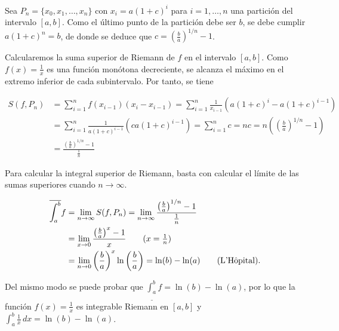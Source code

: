 \documentclass[
  spanish,
  a4paper,
]{scrreport}
\theoremstyle{definition}
\theoremstyle{remark}
\begin{document}
\begin{tcolorbox}[enhanced jigsaw, arc=.35mm, bottomrule=.15mm, bottomtitle=1mm, breakable, colback=white, colbacktitle=quarto-callout-tip-color!10!white, colframe=quarto-callout-tip-color-frame, coltitle=black, left=2mm, leftrule=.75mm, opacityback=0, opacitybacktitle=0.6, rightrule=.15mm, title=\textcolor{quarto-callout-tip-color}{\faLightbulb}\hspace{0.5em}{Solución}, titlerule=0mm, toprule=.15mm, toptitle=1mm]

Sea \(P_n=\{x_0,x_1,\ldots,x_n\}\) con \(x_i=a(1+c)^i\) para
\(i=1,\ldots,n\) una partición del intervalo \([a,b]\). Como el último
punto de la partición debe ser \(b\), se debe cumplir \(a(1+c)^n = b\),
de donde se deduce que \(c=\left(\frac{b}{a}\right)^{1/n}-1\).

Calcularemos la suma superior de Riemann de \(f\) en el intervalo
\([a,b]\). Como \(f(x)=\frac{1}{x}\) es una función monótona
decreciente, se alcanza el máximo en el extremo inferior de cada
subintervalo. Por tanto, se tiene

\begin{align*}
S(f,P_n) 
& = \sum_{i=1}^n f(x_{i-1}) (x_i-x_{i-1})
= \sum_{i=1}^n \frac{1}{x_{i-1}} (a(1+c)^i-a(1+c)^{i-1}) \\
& = \sum_{i=1}^n \frac{1}{a(1+c)^{i-1}} (ca(1+c)^{i-1}) 
= \sum_{i=1}^n c 
= nc 
= n\left(\left(\frac{b}{a}\right)^{1/n}-1\right) \\
& = \frac{\left(\frac{b}{a}\right)^{1/n}-1}{\frac{1}{n}}
\end{align*}

Para calcular la integral superior de Riemann, basta con calcular el
límite de las sumas superiores cuando \(n\to\infty\).

\begin{align*}
\overline{\int_a^b}f 
& = \lim_{n\to\infty} S(f,P_n) 
= \lim_{n\to\infty} \frac{\left(\frac{b}{a}\right)^{1/n}-1}{\frac{1}{n}} \\
& = \lim_{x\to 0} \frac{\left(\frac{b}{a}\right)^x-1}{x} \tag{$x=\frac{1}{n}$}\\
& =  \lim_{n\to 0} \left(\frac{b}{a}\right)^x \ln\left(\frac{b}{a}\right) = \ln(b) - \ln(a) \tag{L'Hôpital}.
\end{align*}

Del mismo modo se puede probar que
\(\underline{\int_a^b} f = \ln(b) - \ln(a)\), por lo que la función
\(f(x)=\frac{1}{x}\) es integrable Riemann en \([a,b]\) y
\(\int_a^b \frac{1}{x}\,dx = \ln(b)-\ln(a)\).

\end{tcolorbox}
\end{document}
